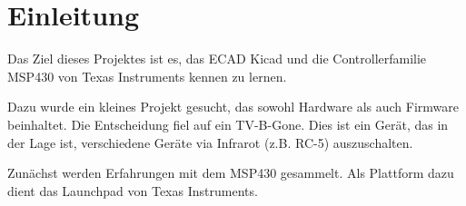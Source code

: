



\section{Einleitung}
Das Ziel dieses Projektes ist es, das ECAD Kicad und die Controllerfamilie 
MSP430 von Texas Instruments kennen zu lernen. 

Dazu wurde ein kleines Projekt gesucht, das sowohl Hardware als auch Firmware 
beinhaltet. Die Entscheidung fiel auf ein TV-B-Gone. Dies ist ein Gerät, das 
in der Lage ist, verschiedene Geräte via Infrarot (z.B. RC-5) auszuschalten. 

Zunächst werden Erfahrungen mit dem MSP430 gesammelt. Als Plattform dazu dient 
das Launchpad von Texas Instruments. 